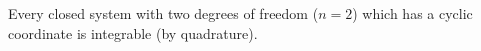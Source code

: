 Every closed system with two degrees of freedom ($n = 2$) which has a cyclic coordinate is integrable (by quadrature).
